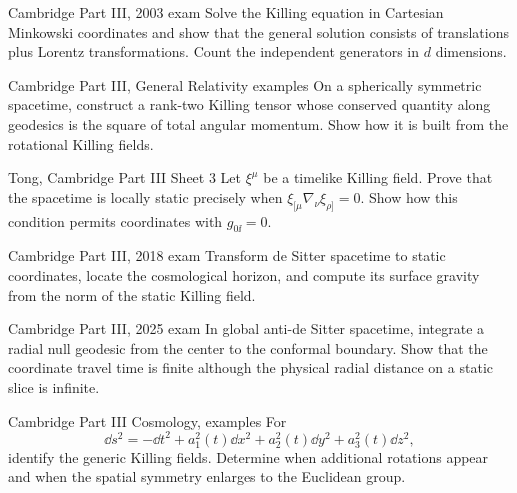 \begin{exercise}{Cambridge Part III, 2003 exam}
Solve the Killing equation in Cartesian Minkowski coordinates and show that
the general solution consists of translations plus Lorentz transformations.
Count the independent generators in \(d\) dimensions.
\end{exercise}

\begin{exercise}{Cambridge Part III, General Relativity examples}
On a spherically symmetric spacetime, construct a rank-two Killing tensor
whose conserved quantity along geodesics is the square of total angular
momentum.  Show how it is built from the rotational Killing fields.
\end{exercise}

\begin{exercise}{Tong, Cambridge Part III Sheet 3}
Let \(\xi^\mu\) be a timelike Killing field.  Prove that the spacetime is
locally static precisely when \(\xi_{[\mu}\nabla_\nu\xi_{\rho]}=0\).  Show how
this condition permits coordinates with \(g_{0\ii}=0\).
\end{exercise}

\begin{exercise}{Cambridge Part III, 2018 exam}
Transform de Sitter spacetime to static coordinates, locate the cosmological
horizon, and compute its surface gravity from the norm of the static Killing
field.
\end{exercise}

\begin{exercise}{Cambridge Part III, 2025 exam}
In global anti-de Sitter spacetime, integrate a radial null geodesic from the
center to the conformal boundary.  Show that the coordinate travel time is
finite although the physical radial distance on a static slice is infinite.
\end{exercise}

\begin{exercise}{Cambridge Part III Cosmology, examples}
For
\[
\dd s^2=-\dd t^2+a_1^2(t)\dd x^2+a_2^2(t)\dd y^2+a_3^2(t)\dd z^2,
\]
identify the generic Killing fields.  Determine when additional rotations
appear and when the spatial symmetry enlarges to the Euclidean group.
\end{exercise}

